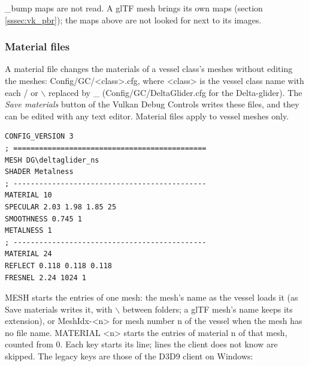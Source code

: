 \documentclass[Orbiter Developer Manual.tex]{subfiles}
\begin{document}
\begin{sloppypar}
\noindent
\_bump maps are not read. A glTF mesh brings its own maps (section \ref{sssec:vk_pbr}); the maps above are not looked for next to its images.


\subsubsection{Material files}
\label{sssec:vk_gcmtrl}
A material file changes the materials of a vessel class's meshes without editing the meshes: Config/GC/<class>.cfg, where <class> is the vessel class name with each / or $\backslash$ replaced by \_ (Config/GC/DeltaGlider.cfg for the Delta-glider). The \textit{Save materials} button of the Vulkan Debug Controls writes these files, and they can be edited with any text editor. Material files apply to vessel meshes only.

\begin{lstlisting}[language=OSFS]
CONFIG_VERSION 3
; =============================================
MESH DG\deltaglider_ns
SHADER Metalness
; ---------------------------------------------
MATERIAL 10
SPECULAR 2.03 1.98 1.85 25
SMOOTHNESS 0.745 1
METALNESS 1
; ---------------------------------------------
MATERIAL 24
REFLECT 0.118 0.118 0.118
FRESNEL 2.24 1024 1
\end{lstlisting}

\noindent
MESH starts the entries of one mesh: the mesh's name as the vessel loads it (as Save materials writes it, with $\backslash$ between folders; a glTF mesh's name keeps its extension), or MeshIdx-<n> for mesh number n of the vessel when the mesh has no file name. MATERIAL <n> starts the entries of material n of that mesh, counted from 0. Each key starts its line; lines the client does not know are skipped. The legacy keys are those of the D3D9 client on Windows:


\end{sloppypar}
\end{document}
